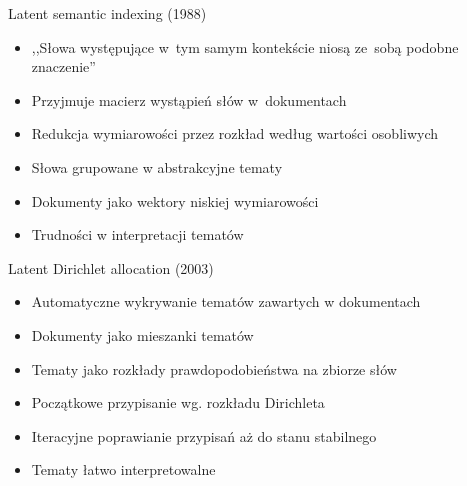 \documentclass{beamer}
\begin{document}
	\begin{frame}{Latent semantic indexing (1988)}
		\begin{itemize}
			\item ,,Słowa występujące w~tym samym kontekście niosą ze~sobą podobne znaczenie''
			\item Przyjmuje macierz wystąpień słów w~dokumentach
			\item Redukcja wymiarowości przez rozkład według wartości osobliwych
			\item Słowa grupowane w abstrakcyjne tematy
			\item Dokumenty jako wektory niskiej wymiarowości
			\item Trudności w interpretacji tematów
		\end{itemize}
	\end{frame}
	\begin{frame}{Latent Dirichlet allocation (2003)}
		\begin{itemize}
			\item Automatyczne wykrywanie tematów zawartych w dokumentach
			\item Dokumenty jako mieszanki tematów
			\item Tematy jako rozkłady prawdopodobieństwa na zbiorze słów
			\item Początkowe przypisanie wg. rozkładu Dirichleta
			\item Iteracyjne poprawianie przypisań aż do stanu stabilnego
			\item Tematy łatwo interpretowalne
		\end{itemize}
	\end{frame}
\end{document}
